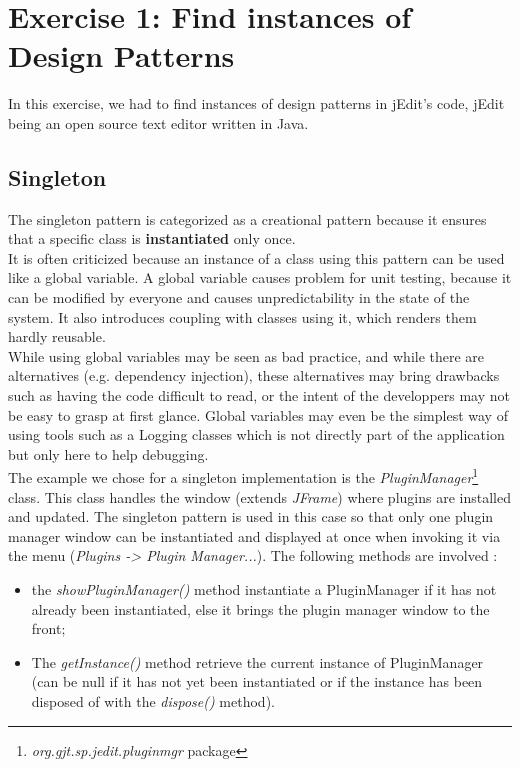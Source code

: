 \section{Exercise 1: Find instances of Design Patterns}

In this exercise, we had to find instances of design patterns in jEdit's
code, jEdit being an open source text editor written in Java.

\subsection{Singleton}

The singleton pattern is categorized as a creational pattern because it
ensures that a specific class is \textbf{instantiated} only once.\\

It is often criticized because an instance of a class using this pattern
can be used like a global variable. A global variable causes problem for
unit testing, because it can be modified by everyone and causes
unpredictability in the state of the system. It also introduces coupling
with classes using it, which renders them hardly reusable.\\

While using global variables may be seen as bad practice, and while
there are alternatives (e.g. dependency injection), these alternatives
may bring drawbacks such as having the code difficult to read, or the
intent of the developpers may not be easy to grasp at first glance.
Global variables may even be the simplest way of using tools such as a
Logging classes which is not directly part of the application but only
here to help debugging.\\

The example we chose for a singleton implementation is the
\emph{PluginManager}\footnote{\emph{org.gjt.sp.jedit.pluginmgr} package}
class. This class handles the window (extends \emph{JFrame}) where
plugins are installed and updated. The singleton pattern is used in this
case so that only one plugin manager window can be instantiated and
displayed at once when invoking it via the menu (\emph{Plugins -> Plugin
Manager...}). The following methods are involved :

\begin{itemize}
    \item the \emph{showPluginManager()} method instantiate a PluginManager if
    it has not already been instantiated, else it brings the plugin manager
    window to the front;

    \item The \emph{getInstance()} method retrieve the current instance of
    PluginManager (can be null if it has not yet been instantiated or if
    the instance has been disposed of with the \emph{dispose()} method).
\end{itemize}

